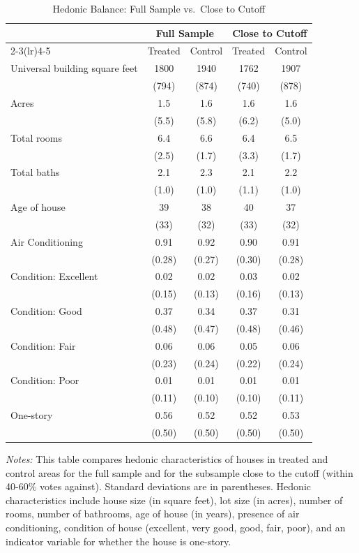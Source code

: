 \begin{table}[H]
    \centering
    \caption{Hedonic Balance: Full Sample vs.\ Close to Cutoff}
    \label{tab:balance_full_vs_close}
    \begin{tabular}{lcccc}
    \toprule
    & \multicolumn{2}{c}{Full Sample} & \multicolumn{2}{c}{Close to Cutoff} \\
    \cmidrule(lr){2-3}\cmidrule(lr){4-5}
    & Treated & Control & Treated & Control \\
    \midrule

    Universal building square feet & 1800 & 1940 & 1762 & 1907 \\
    & (794) & (874) & (740) & (878) \\
    Acres & 1.5 & 1.6 & 1.6 & 1.6 \\
    & (5.5) & (5.8) & (6.2) & (5.0) \\
    Total rooms & 6.4 & 6.6 & 6.4 & 6.5 \\
    & (2.5) & (1.7) & (3.3) & (1.7) \\
    Total baths & 2.1 & 2.3 & 2.1 & 2.2 \\
    & (1.0) & (1.0) & (1.1) & (1.0) \\
    Age of house & 39 & 38 & 40 & 37 \\
    & (33) & (32) & (33) & (32) \\
    Air Conditioning & 0.91 & 0.92 & 0.90 & 0.91 \\
    & (0.28) & (0.27) & (0.30) & (0.28) \\
    Condition: Excellent & 0.02 & 0.02 & 0.03 & 0.02 \\
    & (0.15) & (0.13) & (0.16) & (0.13) \\
    Condition: Good & 0.37 & 0.34 & 0.37 & 0.31 \\
    & (0.48) & (0.47) & (0.48) & (0.46) \\
    Condition: Fair & 0.06 & 0.06 & 0.05 & 0.06 \\
    & (0.23) & (0.24) & (0.22) & (0.24) \\
    Condition: Poor & 0.01 & 0.01 & 0.01 & 0.01 \\
    & (0.11) & (0.10) & (0.10) & (0.11) \\
    One-story & 0.56 & 0.52 & 0.52 & 0.53 \\
    & (0.50) & (0.50) & (0.50) & (0.50) \\
\bottomrule
\end{tabular}
\vspace{0.25em}

\footnotesize \textit{Notes:} This table compares hedonic characteristics of houses in treated and control areas for the full sample and for the subsample close to the cutoff (within 40-60\% votes against). Standard deviations are in parentheses. Hedonic characteristics include house size (in square feet), lot size (in acres), number of rooms, number of bathrooms, age of house (in years), presence of air conditioning, condition of house (excellent, very good, good, fair, poor), and an indicator variable for whether the house is one-story.
\end{table}

